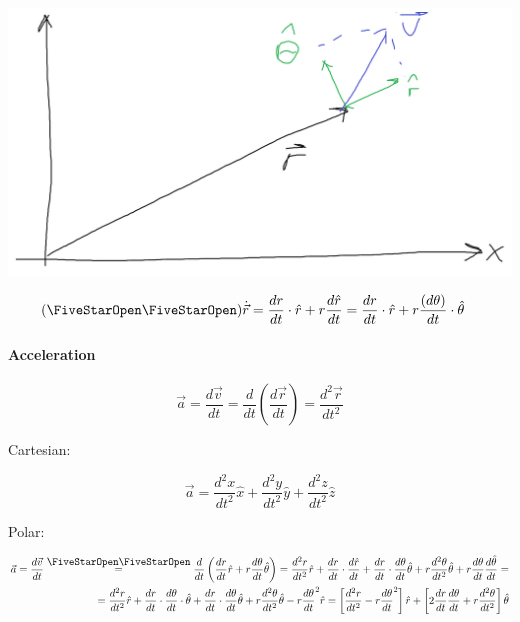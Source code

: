 \begin{center}
	\includegraphics[scale=0.2]{./lect4/pic1.png}
\end{center}
\begin{align*}\left(\mbox{\FiveStarOpen\FiveStarOpen}\right) & \dot{\vec{r}} = \frac{dr}{dt} \cdot \hat{r} + r\frac{d\hat{r}}{dt} =  \frac{dr}{dt} \cdot \hat{r} + r \frac{(d \theta)}{d t}\cdot \hat{\theta}\end{align*}


\paragraph{Acceleration} $$\vec{a} = \frac{d\vec{v}}{dt} = \frac{d}{dt}\left( \frac{d\vec{r}}{dt} \right) = \frac{d^2\vec{r}}{dt^2}$$

Cartesian:

$$\vec{a} = \frac{d^2x}{dt^2}\hat{x} + \frac{d^2y}{dt^2}\hat{y} + \frac{d^2z}{dt^2}\hat{z}$$

Polar:

\begin{align*}\vec{a} = \frac{d\vec{v}}{dt} \stackrel{\mbox{\FiveStarOpen\FiveStarOpen}}{=} \frac{d}{dt}\left( \frac{dr}{dt}\hat{r} + r\frac{d\theta}{dt}\hat{\theta} \right) = \frac{d^2r}{dt^2}\hat{r} + \frac{dr}{dt} \cdot \frac{d\hat{r}}{dt} + \frac{dr}{dt}\cdot\frac{d\theta}{dt}\hat{\theta}  + r\frac{d^2\theta}{dt^2}\hat{\theta}  + r\frac{d\theta}{dt}\frac{d\hat{\theta}}{dt} =\\=
\frac{d^2r}{dt^2}\hat{r} + \frac{dr}{dt} \cdot \frac{d \theta }{d t} \cdot \hat{\theta}+ \frac{dr}{dt}\cdot\frac{d\theta}{dt}\hat{\theta}  + r\frac{d^2\theta}{dt^2}\hat{\theta}  - r\frac{d\theta}{dt}^2 \hat{r} = \left[ \frac{d^2 r}{dt^2} - r \frac{d\theta}{dt}^2\right]\hat{r} + \left[ 2 \frac{dr}{dt}\frac{d\theta}{dt} + r\frac{d^2\theta}{dt^2} \right]\hat{\theta}\end{align*}

